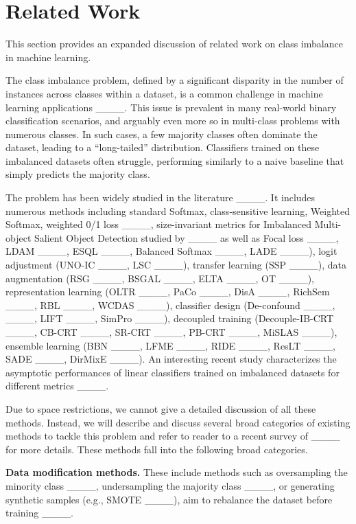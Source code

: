 \section{Related Work}
\label{app:related-work}

This section provides an expanded discussion of related work on class
imbalance in machine learning.

The class imbalance problem, defined by a significant disparity in the
number of instances across classes within a dataset, is a common
challenge in machine learning applications
____.  This issue is prevalent
in many real-world binary classification scenarios, and arguably even
more so in multi-class problems with numerous classes. In such cases,
a few majority classes often dominate the dataset, leading to a
``long-tailed'' distribution.  Classifiers trained on these imbalanced
datasets often struggle, performing similarly to a naive baseline that
simply predicts the majority class.

The problem has been widely studied in the literature
____. It includes numerous methods
including standard Softmax, class-sensitive learning, {Weighted
  Softmax}, weighted 0/1 loss
____, size-invariant
metrics for Imbalanced Multi-object Salient Object Detection studied
by ____ as well as {Focal loss}
____, {LDAM} ____, {ESQL}
____, {Balanced Softmax}
____, {LADE} ____),
logit adjustment ({UNO-IC} ____, {LSC} ____), transfer
learning ({SSP} ____), data augmentation ({RSG}
____, {BSGAL} ____, {ELTA} ____, {OT} ____), representation learning ({OLTR}
____, {PaCo} ____, {DisA} ____, {RichSem} ____, {RBL} ____, {WCDAS} ____),  classifier
design ({De-confound} ____, ____,  {LIFT} ____, {SimPro} ____), decoupled training
({Decouple-IB-CRT} ____, {CB-CRT}
____, {SR-CRT} ____,
      {PB-CRT} ____, {MiSLAS}
      ____), ensemble learning ({BBN}
      ____, {LFME} ____, {RIDE}
      ____, {ResLT} ____, {SADE}
      ____, {DirMixE} ____).  An interesting recent study
      characterizes the asymptotic performances of linear classifiers
      trained on imbalanced datasets for different metrics
      ____.
      
Due to space restrictions, we
cannot give a detailed discussion of all these methods. Instead, we
will describe and discuss several broad categories of existing methods
to tackle this problem and refer to reader to a recent survey of
____ for more details.
%
These methods fall into the following broad categories.

\textbf{Data modification methods.} These include methods such as
oversampling the minority class ____, undersampling
the majority class
____, or
generating synthetic samples (e.g., SMOTE
____), aim to
rebalance the dataset before training
____.

